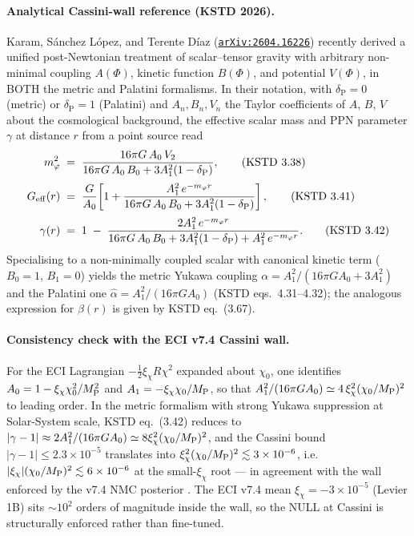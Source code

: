 \documentclass[a4paper,11pt]{article}
\newcommand{\arXiv}[1]{\href{https://arxiv.org/abs/#1}{\texttt{arXiv:#1}}}
\theoremstyle{definition}
\theoremstyle{remark}
\begin{document}
\paragraph{Analytical Cassini-wall reference (KSTD 2026).}
Karam, S\'anchez L\'opez, and Terente D\'iaz \cite{KSTD26}
(\arXiv{2604.16226}) recently derived a unified post-Newtonian
treatment of scalar--tensor gravity with arbitrary non-minimal
coupling $A(\Phi)$, kinetic function $B(\Phi)$, and potential
$V(\Phi)$, in BOTH the metric and Palatini formalisms.  In their
notation, with $\delta_{\mathrm P}=0$ (metric) or $\delta_{\mathrm P}=1$
(Palatini) and $A_n,B_n,V_n$ the Taylor coefficients of $A$, $B$, $V$
about the cosmological background, the effective scalar mass and
PPN parameter $\gamma$ at distance $r$ from a point source read
\begin{align}
   m_\varphi^2 &\;=\; \frac{16\pi G\,A_0\,V_2}
                      {16\pi G\,A_0\,B_0 + 3A_1^2(1-\delta_{\mathrm P})} ,
   \tag{KSTD~3.38}\\[2pt]
   G_{\rm eff}(r) &\;=\; \frac{G}{A_0}\!
     \left[1 + \frac{A_1^2\,e^{-m_\varphi r}}
                    {16\pi G\,A_0\,B_0 + 3A_1^2(1-\delta_{\mathrm P})}\right] ,
   \tag{KSTD~3.41}\\[2pt]
   \gamma(r) &\;=\; 1 \;-\; \frac{2A_1^2\,e^{-m_\varphi r}}
        {16\pi G\,A_0\,B_0 + 3A_1^2(1-\delta_{\mathrm P}) + A_1^2\,e^{-m_\varphi r}} .
   \tag{KSTD~3.42}
\end{align}
Specialising to a non-minimally coupled scalar with canonical
kinetic term ($B_0=1$, $B_1=0$) yields the metric Yukawa coupling
$\alpha = A_1^2/(16\pi G A_0 + 3A_1^2)$ and the Palatini one
$\hat\alpha = A_1^2/(16\pi G A_0)$ (KSTD eqs.~4.31--4.32);
the analogous expression for $\beta(r)$ is given by KSTD eq.~(3.67).

\paragraph{Consistency check with the ECI v7.4 Cassini wall.}
For the ECI Lagrangian $-\tfrac{1}{2}\xi_\chi R\chi^2$ expanded
about $\chi_0$, one identifies $A_0 = 1 - \xi_\chi\chi_0^2/M_{\rm P}^2$
and $A_1 = -\xi_\chi\chi_0/M_{\rm P}$, so that
$A_1^2/(16\pi G A_0) \simeq 4\,\xi_\chi^2(\chi_0/M_{\rm P})^2$
to leading order.  In the metric formalism with strong Yukawa
suppression at Solar-System scale, KSTD eq.~(3.42) reduces to
$|\gamma-1| \approx 2A_1^2/(16\pi G A_0) \simeq 8\xi_\chi^2(\chi_0/M_{\rm P})^2$,
and the Cassini bound $|\gamma-1|\le 2.3\times 10^{-5}$ translates
into $\xi_\chi^2(\chi_0/M_{\rm P})^2 \lesssim 3\times 10^{-6}$, i.e.\
$|\xi_\chi|(\chi_0/M_{\rm P})^2 \lesssim 6\times 10^{-6}$ at the
small-$\xi_\chi$ root --- in agreement with the wall enforced by
the v7.4 NMC posterior \cite[App.~A]{Wolf25}.  The ECI v7.4 mean
$\xi_\chi = -3\times 10^{-5}$ (Levier 1B) sits $\sim 10^{2}$ orders
of magnitude inside the wall, so the NULL at Cassini is
structurally enforced rather than fine-tuned.
\end{document}
